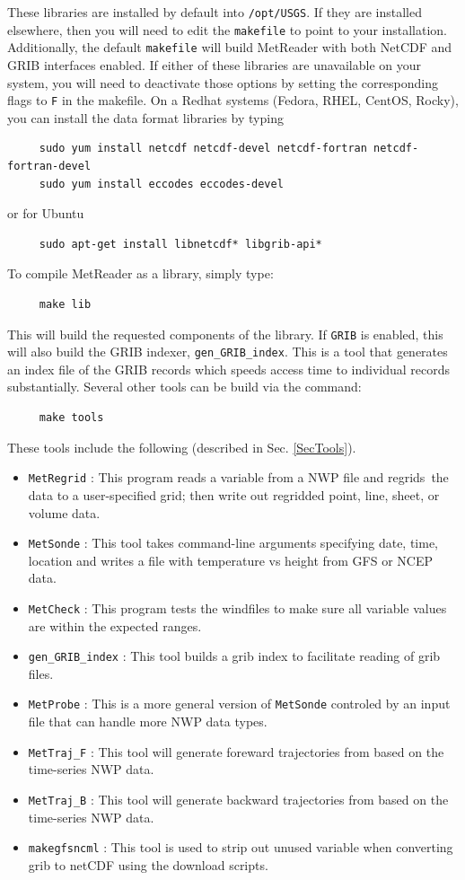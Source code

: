 \documentclass[11pt]{article}   %
\begin{document}
These libraries are installed by default into \texttt{/opt/USGS}.  If they are
installed elsewhere, then you will need to edit the \texttt{makefile}
to point to your installation.
Additionally, the default \texttt{makefile} will build MetReader with both NetCDF and GRIB
interfaces enabled.  If either of these libraries are unavailable on your system, you will need to
deactivate those options by setting the corresponding flags to \texttt{F} in the makefile.
On a Redhat systems (Fedora, RHEL, CentOS, Rocky), you can install the data
format libraries by typing
\begin{verbatim}
     sudo yum install netcdf netcdf-devel netcdf-fortran netcdf-fortran-devel
     sudo yum install eccodes eccodes-devel
\end{verbatim}
or for Ubuntu
\begin{verbatim}
     sudo apt-get install libnetcdf* libgrib-api*
\end{verbatim}
To compile MetReader as a library, simply type:
\begin{verbatim}
     make lib
\end{verbatim}
This will build the requested components of the library.  If \texttt{GRIB} is enabled,
this will also build the GRIB indexer, \texttt{gen\_GRIB\_index}.
This is a tool that generates an index file of the GRIB records which speeds
access time to individual records substantially.
Several other tools can be build via the command:
\begin{verbatim}
     make tools
\end{verbatim}
These tools include the following (described in Sec. \ref{SecTools}).
\begin{itemize}
\item \texttt{MetRegrid} : This program reads a variable from a NWP file and regrids\
the data to a user-specified grid; then write out regridded point, line, sheet, or volume data.
\item \texttt{MetSonde} : This tool takes command-line arguments specifying date, time, location
and writes a file with temperature vs height from GFS or NCEP data.
\item \texttt{MetCheck} : This program tests the windfiles to make sure all variable values
are within the expected ranges.
\item \texttt{gen\_GRIB\_index} : This tool builds a grib index to facilitate reading of grib
files.
\item \texttt{MetProbe} : This is a more general version of \texttt{MetSonde} controled by
an input file that can handle more NWP data types.
\item \texttt{MetTraj\_F} : This tool will generate foreward trajectories from based on the
time-series NWP data.
\item \texttt{MetTraj\_B} : This tool will generate backward trajectories from based on the
time-series NWP data.
\item \texttt{makegfsncml} :  This tool is used to strip out unused variable when converting
grib to netCDF using the download scripts.
\end{itemize}
\end{document}

